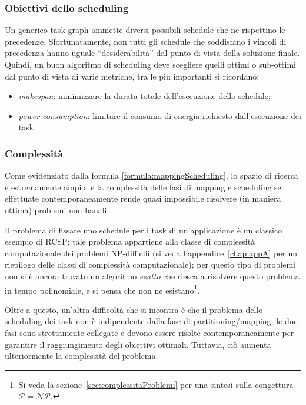\subsubsection{Obiettivi dello scheduling}
Un generico task graph ammette diversi possibili schedule che ne rispettino le 
precedenze. Sfortunatamente, non tutti gli schedule che soddisfano i vincoli di precedenza
hanno uguale ``desiderabilità'' dal punto di vista della soluzione finale. Quindi, un buon
algoritmo di scheduling deve scegliere quelli ottimi o sub-ottimi dal punto di vista di
varie metriche, tra le più importanti si ricordano:
\begin{itemize}
 \item \emph{makespan}: minimizzare la durata totale dell'esecuzione dello schedule;
 \item \emph{power consumption}: limitare il consumo di energia richiesto 
dall'esecuzione dei task.
\end{itemize}


\subsubsection{Complessità}
Come evidenziato dalla formula \eqref{formula:mappingScheduling}, lo spazio di ricerca è 
estremamente ampio, e la complessità delle fasi di mapping e scheduling se effettuate 
contemporaneamente rende quasi impossibile risolvere (in maniera ottima) problemi non 
banali.

Il problema di fissare uno schedule per i task di un'applicazione è un classico esempio 
di \ac{RCSP}; tale problema appartiene alla classe di complessità computazionale dei 
problemi NP-difficili (si veda l'appendice~\ref{chap:appA} per un riepilogo delle classi 
di complessità computazionale); per questo tipo di problemi non si è ancora trovato un 
algoritmo \emph{esatto} che riesca a risolvere questo problema in tempo 
polinomiale, e si pensa che non ne esistano\footnote{Si veda la
sezione~\ref{sec:complessitaProblemi} per una sintesi sulla congettura $\mathcal{P} = 
\mathcal{NP}$.}.

Oltre a questo, un'altra difficoltà che si incontra è che il problema dello scheduling 
dei task non è indipendente dalla fase di partitioning/mapping; le due fasi sono strettamente 
collegate e devono essere risolte contemporaneamente per garantire il raggiungimento 
degli obiettivi ottimali. Tuttavia, ciò aumenta ulteriormente la complessità del 
problema.


